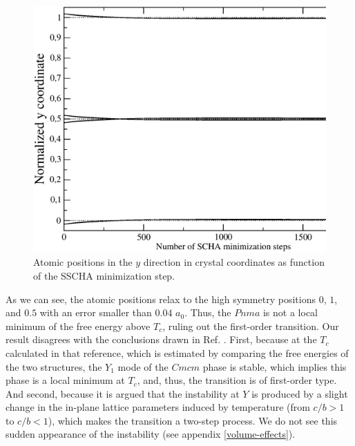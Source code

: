 \begin{figure}[h]
\begin{center}
\includegraphics[width=0.9\linewidth]{Figures/positions.eps}
\caption{Atomic positions in the $y$ direction in crystal coordinates as function of the SSCHA minimization step.}
\label{atomic-relaxation}
\end{center}
\end{figure}
As we can see, the atomic positions relax to the high symmetry positions $0$, $1$, and $0.5$ with an error smaller than $0.04$ $a_{0}$. Thus, the $Pnma$ is not a local minimum of the free energy above $T_{c}$, ruling out the 
first-order transition. Our result disagrees with the conclusions drawn in Ref. \cite{dewandre2016two}.
First, because at the $T_{c}$ calculated in that reference, which is estimated by comparing the free energies of the 
two structures, the $Y_{1}$ mode of the $Cmcm$ phase is stable, which implies this phase is a local minimum 
at $T_{c}$, and, thus, the transition is of first-order type. And second, because it is argued that the instability 
at $Y$ is produced by a slight change in the in-plane lattice parameters induced by temperature (from $c/b>1$ to 
$c/b<1$), which makes the transition a two-step process. We do not see this sudden appearance of the instability 
(see appendix \ref{volume-effects}). \\

